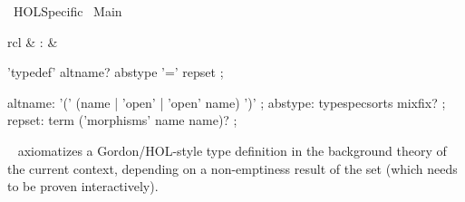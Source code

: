 %
\begin{isabellebody}%
\def\isabellecontext{HOL{\isaliteral{5F}{\isacharunderscore}}Specific}%
%
\isadelimtheory
%
\endisadelimtheory
%
\isatagtheory
{}\isamarkupfalse%
\ HOL{}Specific\isanewline
{}\ Main\isanewline
{}%
\endisatagtheory
{\isafoldtheory}%
%
\isadelimtheory
%
\endisadelimtheory
%
\isamarkuptrue%
%
\isamarkuptrue%
%
\begin{isamarkuptext}%
\begin{matharray}{rcl}
    \hypertarget{command.HOL.typedef}{\hyperlink{command.HOL.typedef}{\mbox{}}} & : &  \\
  \end{matharray}

  \begin{rail}
    'typedef' altname? abstype '=' repset
    ;

    altname: '(' (name | 'open' | 'open' name) ')'
    ;
    abstype: typespecsorts mixfix?
    ;
    repset: term ('morphisms' name name)?
    ;
  \end{rail}

  \begin{description}

  \item \hyperlink{command.HOL.typedef}{\mbox{}}~
  axiomatizes a Gordon/HOL-style type definition in the background
  theory of the current context, depending on a non-emptiness result
  of the set  (which needs to be proven interactively).


\end{description}
\end{isamarkuptext}
\end{isabellebody}
